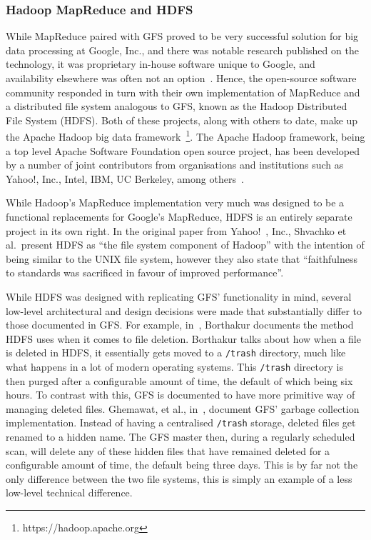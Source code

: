\documentclass[a4paper,11pt]{article}
\begin{document}


\subsubsection{Hadoop MapReduce and HDFS} %
\label{ssub:hadoop_mapreduce_and_hdfs}

While MapReduce paired with GFS proved to be very successful solution for big data processing at Google, Inc., and
there was notable research published on the technology, it was proprietary in-house software unique to Google, and
availability elsewhere was often not an option~\cite{grossman2009varieties}. Hence, the open-source software community
responded in turn with their own implementation of MapReduce and a distributed file system analogous to GFS, known as the
Hadoop Distributed File System (HDFS). Both of these projects, along with others to date, make up the Apache Hadoop
big data framework~\footnote{https://hadoop.apache.org}. The Apache Hadoop framework, being a top level Apache Software
Foundation open source project, has been developed by a number of joint contributors from organisations and institutions
such as Yahoo!, Inc., Intel, IBM, UC Berkeley, among others~\cite{hadoop_committers}.

While Hadoop's MapReduce implementation very much was designed to be a functional replacements for Google's MapReduce,
HDFS is an entirely separate project in its own right. In the original paper from Yahoo!~\cite{shvachko2010hadoop},
Inc., Shvachko et al.\ present HDFS as ``the file system component of Hadoop'' with the intention of being similar to
the UNIX file system, however they also state that ``faithfulness to standards was sacrificed in favour of improved
performance''.

While HDFS was designed with replicating GFS' functionality in mind, several low-level architectural and design decisions
were made that substantially differ to those documented in GFS. For example, in~\cite{borthakur2007hadoop}, Borthakur
documents the method HDFS uses when it comes to file deletion. Borthakur talks about how when a file is deleted in HDFS,
it essentially gets moved to a \texttt{/trash} directory, much like what happens in a lot of modern operating systems.
This \texttt{/trash} directory is then purged after a configurable amount of time, the default of which being six hours.
To contrast with this, GFS is documented to have more primitive way of managing deleted files. Ghemawat, et al.,
in~\cite{ghemawat_google_2003}, document GFS' garbage collection implementation. Instead of having a centralised
\texttt{/trash} storage, deleted files get renamed to a hidden name. The GFS master then, during a regularly scheduled
scan, will delete any of these hidden files that have remained deleted for a configurable amount of time, the default
being three days. This is by far not the only difference between the two file systems, this is simply an example of a
less low-level technical difference.
\end{document}
